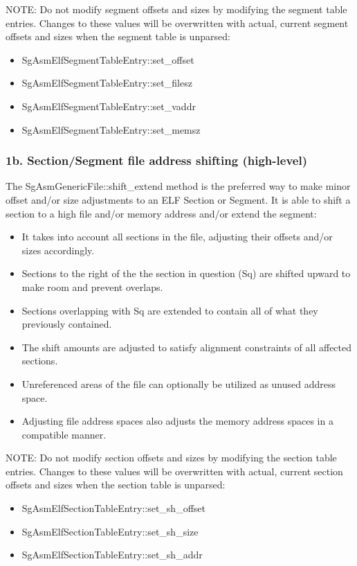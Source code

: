    NOTE: Do not modify segment offsets and sizes by modifying the segment table entries. Changes to these values will be
   overwritten with actual, current segment offsets and sizes when the segment table is unparsed:
\begin{itemize}
   \item SgAsmElfSegmentTableEntry::set\_offset
   \item SgAsmElfSegmentTableEntry::set\_filesz
   \item SgAsmElfSegmentTableEntry::set\_vaddr
   \item SgAsmElfSegmentTableEntry::set\_memsz
\end{itemize}

\subsubsection{1b. Section/Segment file address shifting (high-level)}
   
   The SgAsmGenericFile::shift\_extend method is the preferred way to make minor offset and/or size adjustments to an ELF
   Section or Segment. It is able to shift a section to a high file and/or memory address and/or extend the segment:
\begin{itemize}
   \item It takes into account all sections in the file, adjusting their offsets and/or sizes accordingly.

   \item Sections to the right of the the section in question (Sq) are shifted upward to make room and prevent overlaps.

   \item Sections overlapping with Sq are extended to contain all of what they previously contained.

   \item The shift amounts are adjusted to satisfy alignment constraints of all affected sections.

   \item Unreferenced areas of the file can optionally be utilized as unused address space.

   \item Adjusting file address spaces also adjusts the memory address spaces in a compatible manner.
\end{itemize}

   NOTE: Do not modify section offsets and sizes by modifying the section table entries. Changes to these values will be
   overwritten with actual, current section offsets and sizes when the section table is unparsed:
\begin{itemize}
	\item SgAsmElfSectionTableEntry::set\_sh\_offset
	\item SgAsmElfSectionTableEntry::set\_sh\_size
	\item SgAsmElfSectionTableEntry::set\_sh\_addr
\end{itemize}

